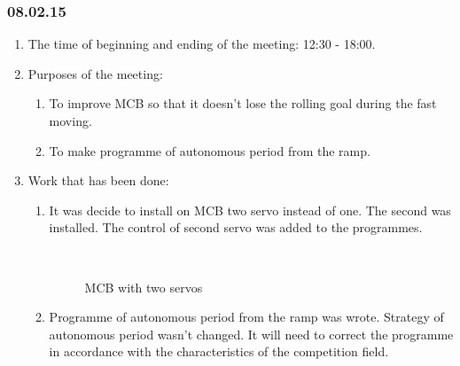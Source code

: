 \subsubsection{08.02.15}
\begin{enumerate}
	
	\item The time of beginning and ending of the meeting: 12:30 - 18:00.
	
	\item Purposes of the meeting:
	\begin{enumerate}
		
		\item To improve MCB so that it doesn't lose the rolling goal during the fast moving.
		
		\item To make programme of autonomous period from the ramp.
		
	\end{enumerate}

	\item Work that has been done:
	\begin{enumerate}
		
		\item It was decide to install on MCB two servo instead of one. The second was installed. The control of second servo was added to the programmes.
		\begin{figure}[H]
			\begin{minipage}[h]{0.2\linewidth}
				\center  
			\end{minipage}
			\begin{minipage}[h]{0.6\linewidth}
				\caption{MCB with two servos}
			\end{minipage}
		\end{figure}
		
		\item Programme of autonomous period from the ramp was wrote. Strategy of autonomous period wasn't changed. It will need to correct the programme in accordance with the characteristics of the competition field.


\end{enumerate}
\end{enumerate}

